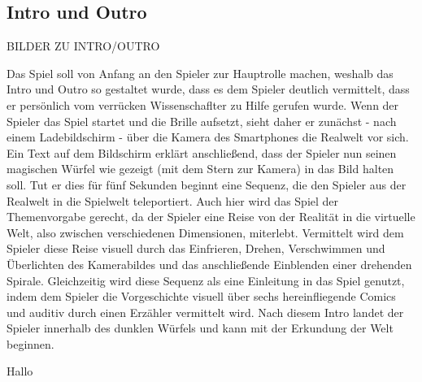 \subsection{Intro und Outro}

BILDER ZU INTRO/OUTRO

Das Spiel soll von Anfang an den Spieler zur Hauptrolle machen, weshalb das Intro und Outro so gestaltet wurde, dass es dem Spieler deutlich vermittelt, dass er persönlich vom verrücken Wissenschaflter zu Hilfe gerufen wurde. Wenn der Spieler das Spiel startet und die Brille aufsetzt, sieht daher er zunächst - nach einem Ladebildschirm - über die Kamera des Smartphones die Realwelt vor sich. Ein Text auf dem Bildschirm erklärt anschließend, dass der Spieler nun seinen magischen Würfel wie gezeigt (mit dem Stern zur Kamera) in das Bild halten soll. Tut er dies für fünf Sekunden beginnt eine Sequenz, die den Spieler aus der Realwelt in die Spielwelt teleportiert. Auch hier wird das Spiel der Themenvorgabe gerecht, da der Spieler eine Reise von der Realität in die virtuelle Welt, also zwischen verschiedenen Dimensionen, miterlebt. Vermittelt wird dem Spieler diese Reise visuell durch das Einfrieren, Drehen, Verschwimmen und Überlichten des Kamerabildes und das anschließende Einblenden einer drehenden Spirale. Gleichzeitig wird diese Sequenz als eine Einleitung in das Spiel genutzt, indem dem Spieler die Vorgeschichte visuell über sechs hereinfliegende Comics und auditiv durch einen Erzähler vermittelt wird. Nach diesem Intro landet der Spieler innerhalb des dunklen Würfels und kann mit der Erkundung der Welt beginnen.



Hallo